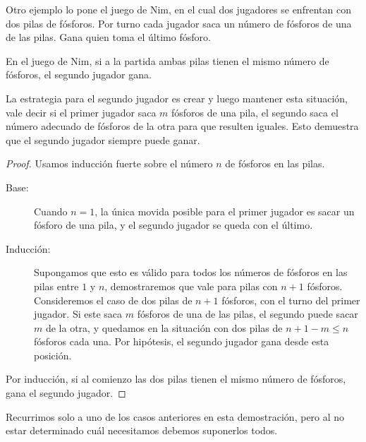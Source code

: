   Otro ejemplo lo pone el juego de Nim,%
  en el cual dos jugadores se enfrentan con dos pilas de fósforos.
  Por turno cada jugador
  saca un número de fósforos de una de las pilas.
  Gana quien toma el último fósforo.
  \begin{proposition}
    \label{prop:Nim}
    En el juego de Nim,
    si a la partida ambas pilas tienen el mismo número de fósforos,
    el segundo jugador gana.
  \end{proposition}
  La estrategia para el segundo jugador
  es crear y luego mantener esta situación,
  vale decir si el primer jugador saca \(m\) fósforos de una pila,
  el segundo saca el número adecuado de fósforos de la otra
  para que resulten iguales.
  Esto demuestra que el segundo jugador siempre puede ganar.
  \begin{proof}
    Usamos inducción fuerte
    sobre el número \(n\) de fósforos en las pilas.
    \begin{description}
    \item[Base:]
      Cuando \(n = 1\),
      la única movida posible
      para el primer jugador es sacar un fósforo
      de una pila,
      y el segundo jugador se queda con el último.
    \item[Inducción:]
      Supongamos que esto es válido
      para todos los números de fósforos
      en las pilas entre \(1\) y \(n\),
      demostraremos que vale para pilas con \(n + 1\) fósforos.
      Consideremos el caso de dos pilas de \(n + 1\) fósforos,
      con el turno del primer jugador.
      Si este saca \(m\) fósforos de una de las pilas,
      el segundo puede sacar \(m\) de la otra,
      y quedamos en la situación
      con dos pilas de \(n + 1 - m \le n\)
      fósforos cada una.
      Por hipótesis,
      el segundo jugador gana desde esta posición.
    \end{description}
    Por inducción,
    si al comienzo las dos pilas tienen el mismo número de fósforos,
    gana el segundo jugador.
  \end{proof}
  Recurrimos solo a uno de los casos anteriores
  en esta demostración,
  pero al no estar determinado cuál
  necesitamos debemos suponerlos todos.

